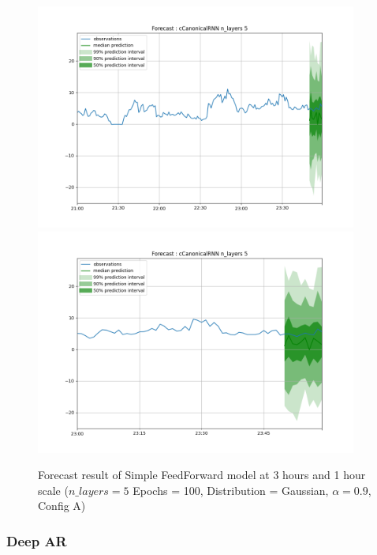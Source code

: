 \documentclass[a4paper, 12pt]{article}
\begin{document}
\begin{figure}[!h]
    \centering
    \includegraphics[width=400px]{plots/forecast/a/cCanonicalRNN/n_layers/5/180.png}
    \includegraphics[width=400px]{plots/forecast/a/cCanonicalRNN/n_layers/5/60.png}
    \caption{Forecast result of Simple FeedForward model at 3 hours and 1 hour scale ($n\_layers = 5$ Epochs = 100, Distribution = Gaussian, $\alpha = 0.9$, Config A)}
    \label{fig:canonicalrnn}
\end{figure}


\subsubsection{Deep AR} \label{comp_deepar}
\end{document}

